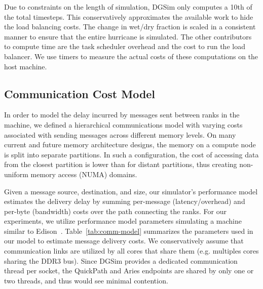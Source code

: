 Due to constraints on the length of simulation, DGSim only computes a 10th of the total timesteps. This conservatively approximates the available work to hide the load balancing costs. The change in wet/dry fraction is scaled in a consistent manner to ensure that the entire hurricane is simulated.
The other contributors to compute time are the task scheduler overhead and the cost to run the load balancer.
We use timers to measure the actual costs of these computations on the host machine.

\subsection{Communication Cost Model}

In order to model the delay incurred by messages sent between ranks in
the machine, we defined a hierarchical communications model with varying
costs associated with sending messages across different memory levels.
On many current and future memory architecture designs, the memory on
a compute node is split into separate partitions.
In such a configuration, the cost of accessing data from the closest
partition is lower than for distant partitions, thus
creating non-uniform memory access (NUMA) domains.

Given a message source, destination, and size,
our simulator's performance model estimates the delivery delay by
summing per-message (latency/overhead) and per-byte
(bandwidth) costs over the path connecting the ranks.
For our experiments, we utilize performance model parameters simulating
a machine similar to Edison~\cite{Edison}.
Table~\ref{tab:comm-model} summarizes the parameters used in our
model to estimate message delivery costs.
We conservatively assume that communication links are utilized
by all cores that share them (e.g. multiples cores sharing the DDR3 bus).
Since DGSim provides a dedicated communication thread per socket,
the QuickPath and Aries endpoints are shared by only one or two
threads, and thus would see minimal contention.

